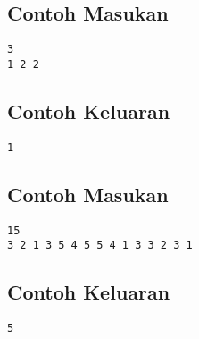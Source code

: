 \documentclass{article}
\begin{document}
\begin{multicols}{2}
\subsection*{Contoh Masukan}
\begin{lstlisting}
3
1 2 2
\end{lstlisting}
\columnbreak
\subsection*{Contoh Keluaran}
\begin{lstlisting}
1
\end{lstlisting}
\vfill
\null
\end{multicols}

\begin{multicols}{2}
\subsection*{Contoh Masukan}
\begin{lstlisting}
15
3 2 1 3 5 4 5 5 4 1 3 3 2 3 1
\end{lstlisting}
\columnbreak
\subsection*{Contoh Keluaran}
\begin{lstlisting}
5
\end{lstlisting}
\vfill
\null
\end{multicols}


\pagebreak
\end{document}
